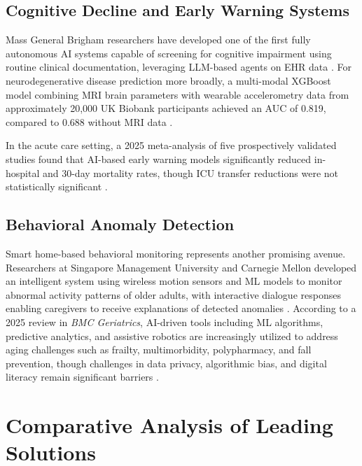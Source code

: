 \documentclass[conference]{IEEEtran}
\begin{document}
\subsection{Cognitive Decline and Early Warning Systems}

Mass General Brigham researchers have developed one of the first fully autonomous AI systems capable of screening for cognitive impairment using routine clinical documentation, leveraging LLM-based agents on EHR data \cite{mgb_cognitive}. For neurodegenerative disease prediction more broadly, a multi-modal XGBoost model combining MRI brain parameters with wearable accelerometry data from approximately 20,000 UK Biobank participants achieved an AUC of 0.819, compared to 0.688 without MRI data \cite{plos_neuro}.

In the acute care setting, a 2025 meta-analysis of five prospectively validated studies found that AI-based early warning models significantly reduced in-hospital and 30-day mortality rates, though ICU transfer reductions were not statistically significant \cite{pmc_ews}.

\subsection{Behavioral Anomaly Detection}

Smart home-based behavioral monitoring represents another promising avenue. Researchers at Singapore Management University and Carnegie Mellon developed an intelligent system using wireless motion sensors and ML models to monitor abnormal activity patterns of older adults, with interactive dialogue responses enabling caregivers to receive explanations of detected anomalies \cite{arxiv_anomaly}. According to a 2025 review in \textit{BMC Geriatrics}, AI-driven tools including ML algorithms, predictive analytics, and assistive robotics are increasingly utilized to address aging challenges such as frailty, multimorbidity, polypharmacy, and fall prevention, though challenges in data privacy, algorithmic bias, and digital literacy remain significant barriers \cite{bmc_smart_aging}.

\section{Comparative Analysis of Leading Solutions}
\end{document}
